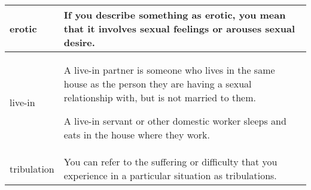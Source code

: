 \documentclass{article}
\begin{document}
\begin{center}
\begin{longtable}{|l|p{9cm}|}
\hline
erotic
&
If you describe something as erotic, you mean that it involves sexual feelings or arouses sexual desire.
\\

\hline
live-in
&
A live-in partner is someone who lives in the same house as the person they are having a sexual relationship with, but is not married to them.
\par
A live-in servant or other domestic worker sleeps and eats in the house where they work.
\\

\hline
tribulation
&
You can refer to the suffering or difficulty that you experience in a particular situation as tribulations.
\\

\hline

\end{longtable}
\end{center}
\end{document}
